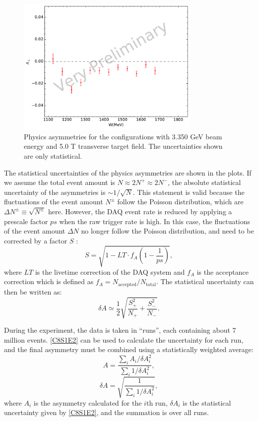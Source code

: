 \begin{figure}[tb!]
  \centering
  \includegraphics[width=0.79\textwidth]{figs/asymmetry-33505090.pdf}
  \caption[Physics asymmetries with $E=3.350$ GeV and $B=5.0$ T.]{Physics asymmetries for the configurations with 3.350 GeV beam energy and 5.0 T transverse target field. The uncertainties shown are only statistical. \label{C8S1F4}}
\end{figure}

The statistical uncertainties of the physics asymmetries are shown in the plots. If we assume the total event amount is $N\approx2N^+\approx2N^-$, the absolute statistical uncertainty of the asymmetries is $\sim1/\sqrt{N}$. This statement is valid because the fluctuations of the event amount $N^{\pm}$ follow the Poisson distribution, which are $\Delta N^{\pm}\equiv\sqrt{N^{\pm}}$ here. However, the DAQ event rate is reduced by applying a prescale factor $ps$ when the raw trigger rate is high. In this case, the fluctuations of the event amount $\Delta N$ no longer follow the Poisson distribution, and need to be corrected by a factor $S$ \cite{Qiang2007}:
\begin{equation} \label{C8S1E1}
S = \sqrt{1-LT\cdot f_A(1-\frac{1}{ps})},
\end{equation}
where $LT$ is the livetime correction of the DAQ system and $f_A$ is the acceptance correction which is defined as $f_A=N_{\mathrm{accepted}}/N_{\mathrm{total}}$. The statistical uncertainty can then be written as:
\begin{equation} \label{C8S1E2}
\delta A \simeq \frac{1}{2}\sqrt{\frac{S_+^2}{N_+}+\frac{S_-^2}{N_-}}.
\end{equation}

During the experiment, the data is taken in ``runs'', each containing about 7 million events. \cref{C8S1E2} can be used to calculate the uncertainty for each run, and the final asymmetry must be combined using a statistically weighted average:
\begin{equation} \label{C8S1E3}
A = \frac{\sum_iA_i/\delta A_i^2}{\sum_i1/\delta A_i^2},
\end{equation}
\begin{equation} \label{C8S1E4}
\delta A = \sqrt{\frac{1}{\sum_i1/\delta A_i^2}},
\end{equation}
where $A_i$ is the asymmetry calculated for the $i$th run, $\delta A_i$ is the statistical uncertainty given by \cref{C8S1E2}, and the summation is over all runs.

